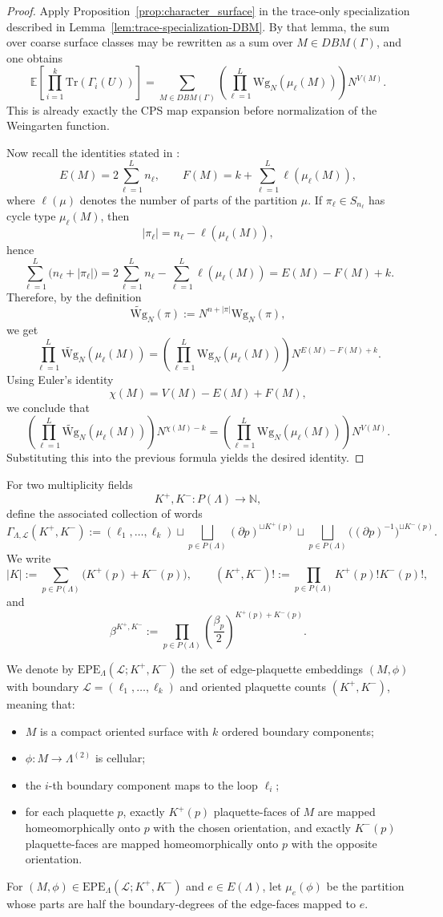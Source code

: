 \documentclass[11pt,a4paper,reqno]{article}
\theoremstyle{definition}
\theoremstyle{remark}
\newcommand\Tr{\mathrm{Tr}}
\newcommand\Lc{{\mathcal{L}}}
\newcommand\EPE{{\mathrm{EPE}}}
\begin{document}
\begin{proof}
Apply Proposition~\ref{prop:character_surface} in the trace-only specialization described in Lemma~\ref{lem:trace-specialization-DBM}. By that lemma, the sum over coarse surface
classes may be rewritten as a sum over $M\in DBM(\Gamma)$, and one obtains
\[
\mathbb E\left[\prod_{i=1}^k \Tr(\Gamma_i(U))\right]=\sum_{M\in DBM(\Gamma)}\left(\prod_{\ell=1}^L \mathrm{Wg}_N(\mu_\ell(M))\right)N^{V(M)}.
\]
This is already exactly the CPS map expansion before normalization of the Weingarten function. 

Now recall the identities stated in \cite{CPS25}:
\[
E(M)=2\sum_{\ell=1}^L n_\ell,\qquad F(M)=k+\sum_{\ell=1}^L \ell(\mu_\ell(M)),
\]
where $\ell(\mu)$ denotes the number of parts of the partition $\mu$. If $\pi_\ell\in S_{n_\ell}$ has cycle type $\mu_\ell(M)$, then
\[
|\pi_\ell|=n_\ell-\ell(\mu_\ell(M)),
\]
hence
\[
\sum_{\ell=1}^L \bigl(n_\ell+|\pi_\ell|\bigr)=2\sum_{\ell=1}^L n_\ell-\sum_{\ell=1}^L \ell(\mu_\ell(M))=E(M)-F(M)+k.
\]
Therefore, by the definition
\[
\widetilde{\mathrm{Wg}}_{N}(\pi):=N^{n+|\pi|}\mathrm{Wg}_{N}(\pi),
\]
we get
\[
\prod_{\ell=1}^L \widetilde{\mathrm{Wg}}_N(\mu_\ell(M))=\left(\prod_{\ell=1}^L \mathrm{Wg}_N(\mu_\ell(M))\right)
N^{E(M)-F(M)+k}.
\]
Using Euler's identity
\[
\chi(M)=V(M)-E(M)+F(M),
\]
we conclude that
\[
\left(\prod_{\ell=1}^L \widetilde{\mathrm{Wg}}_N(\mu_\ell(M))\right)N^{\chi(M)-k}=\left(\prod_{\ell=1}^L \mathrm{Wg}_N(\mu_\ell(M))\right)N^{V(M)}.
\]
Substituting this into the previous formula yields the desired identity. 
\end{proof}

For two multiplicity fields
\[
K^+,K^-:P(\Lambda)\to \mathbb N,
\]
define the associated collection of words
\[
\Gamma_{\Lambda,\Lc}(K^+,K^-):=(\ell_1,\dots,\ell_k)\sqcup\bigsqcup_{p\in P(\Lambda)} (\partial p)^{\sqcup K^+(p)}\sqcup\bigsqcup_{p\in P(\Lambda)} \bigl((\partial p)^{-1}\bigr)^{\sqcup K^-(p)} .
\]
We write
\[
|K|:=\sum_{p\in P(\Lambda)} \bigl(K^+(p)+K^-(p)\bigr),\qquad(K^+,K^-)!:=\prod_{p\in P(\Lambda)} K^+(p)!K^-(p)!,
\]
and
\[
\beta^{K^+,K^-}:=\prod_{p\in P(\Lambda)}\left(\frac{\beta_p}{2}\right)^{K^+(p)+K^-(p)}.
\]

We denote by $\EPE_{\Lambda}(\Lc;K^+,K^-)$ the set of edge-plaquette embeddings $(M,\phi)$ with boundary $\Lc=(\ell_1,\dots,\ell_k)$ and oriented plaquette counts $(K^+,K^-)$, meaning that:
\begin{itemize}
\item $M$ is a compact oriented surface with $k$ ordered boundary components;
\item $\phi:M\to \Lambda^{(2)}$ is cellular;
\item the $i$-th boundary component maps to the loop $\ell_i$;
\item for each plaquette $p$, exactly $K^+(p)$ plaquette-faces of $M$ are mapped homeomorphically onto $p$ with the chosen orientation, and exactly $K^-(p)$ plaquette-faces are mapped homeomorphically onto $p$ with the opposite orientation.
\end{itemize}
For $(M,\phi)\in \EPE_{\Lambda}(\Lc;K^+,K^-)$ and $e\in E(\Lambda)$, let $\mu_e(\phi)$ be the partition whose parts are half the boundary-degrees of the edge-faces mapped to $e$.
\end{document}
